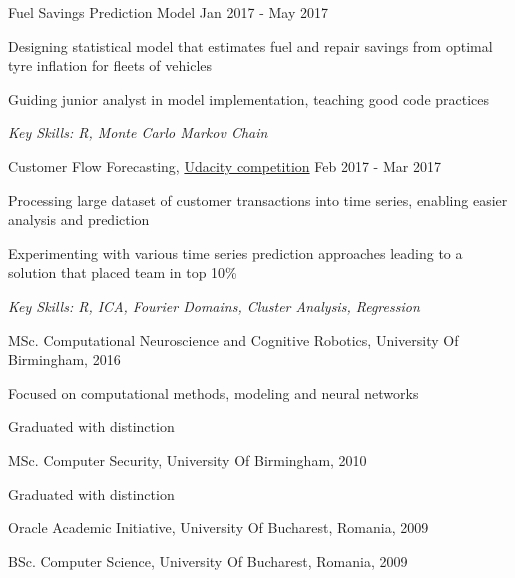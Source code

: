 \documentclass[11pt,article,oneside]{memoir}
\newenvironment{itemize*}{%
  \renewcommand\labelitemi{\textbullet}
  \footnotesize
  \begin{itemize}%
    \setlength{\itemsep}{0pt}}%
  {\end{itemize}
}
\begin{document}
\normalsize
\medskip
\ind Fuel Savings Prediction Model \hfill Jan 2017 - May 2017
\begin{itemize*}
  \item Designing statistical model that estimates fuel and repair savings from optimal tyre inflation for fleets of vehicles
  \item Guiding junior analyst in model implementation, teaching good code practices
\end{itemize*}
\ind \hspace{0.35in} \footnotesize \emph{Key Skills: R, Monte Carlo Markov Chain}

\normalsize
\medskip
\ind Customer Flow Forecasting, \href{https://blog.udacity.com/2017/01/data-science-enthusiasts-win-10000.html}{Udacity competition} \hfill Feb 2017 - Mar 2017
\begin{itemize*}
  \item Processing large dataset of customer transactions into time series, enabling easier analysis and prediction  
  \item Experimenting with various time series prediction approaches leading to a solution that placed team in top 10\%
\end{itemize*}
\ind \hspace{0.35in} \footnotesize \emph{Key Skills: R, ICA, Fourier Domains, Cluster Analysis, Regression}



\normalsize
\bigskip
{}

\ind MSc. Computational Neuroscience and Cognitive Robotics, University Of Birmingham, \hfill 2016

\ind \hspace{0.35in} \footnotesize Focused on computational methods, modeling and neural networks \normalsize

\ind \hspace{0.35in} \footnotesize Graduated with distinction \normalsize

\ind MSc. Computer Security, University Of Birmingham, \hfill 2010

\ind \hspace{0.35in} \footnotesize Graduated with distinction \normalsize

\ind Oracle Academic Initiative, University Of Bucharest, Romania, \hfill 2009

\ind BSc. Computer Science, University Of Bucharest, Romania, \hfill 2009
\end{document}

